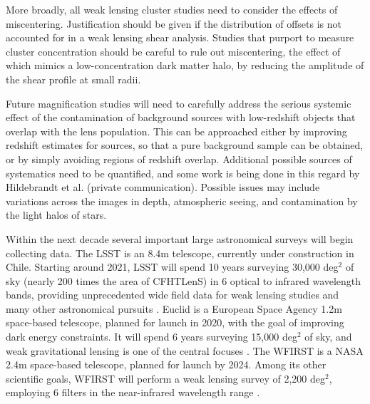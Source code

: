 More broadly, all weak lensing cluster studies need to consider the effects of miscentering. Justification should be given if the distribution of offsets is not accounted for in a weak lensing shear analysis. Studies that purport to measure cluster concentration should be careful to rule out miscentering, the effect of which mimics a low-concentration dark matter halo, by reducing the amplitude of the shear profile at small radii. 

Future magnification studies will need to carefully address the serious systemic effect of the contamination of background sources with low-redshift objects that overlap with the lens population. This can be approached either by improving redshift estimates for sources, so that a pure background sample can be obtained, or by simply avoiding regions of redshift overlap. Additional possible sources of systematics need to be quantified, and some work is being done in this regard by Hildebrandt et al. (private communication). Possible issues may include variations across the images in depth, atmospheric seeing, and contamination by the light halos of stars.

Within the next decade several important large astronomical surveys will begin collecting data. The \acf{LSST} is an 8.4m telescope, currently under construction in Chile. Starting around 2021, \ac{LSST} will spend 10 years surveying 30,000 deg$^2$ of sky (nearly 200 times the area of \ac{CFHTLenS}) in 6 optical to infrared wavelength bands, providing unprecedented wide field data for weak lensing studies and many other astronomical pursuits \citep{LSST2.0}. \acs{Euclid} is a European Space Agency 1.2m space-based telescope, planned for launch in 2020, with the goal of improving dark energy constraints. It will spend 6 years surveying 15,000 deg$^2$ of sky, and weak gravitational lensing is one of the central focuses \citep{Euclid}. The \acf{WFIRST} is a NASA 2.4m space-based telescope, planned for launch by 2024. Among its other scientific goals, \ac{WFIRST} will perform a weak lensing survey of 2,200 deg$^2$, employing 6 filters in the near-infrared wavelength range \citep{WFIRST}.

